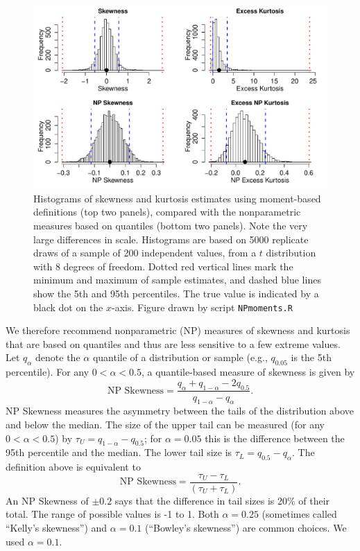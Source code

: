 \documentclass[12pt]{article}
\newcommand{\be}{\begin{equation}}
\newcommand{\ee}{\end{equation}}
\begin{document}
\begin{spacing}{1.9}
\begin{figure}[tbp]
\includegraphics[width=\textwidth]{figures/NPmoments.pdf}
\caption{Histograms of skewness and kurtosis estimates using moment-based definitions (top two panels), compared with the nonparametric measures based on quantiles (bottom two panels). 
Note the very large differences in scale. Histograms are based on 5000 replicate draws 
of a sample of 200 independent values, from a $t$ distribution with 8 degrees of freedom. 
Dotted red vertical lines mark the minimum and maximum of sample estimates, and dashed blue lines show the 5th and 95th percentiles. 
The true value is indicated by a black dot on the $x$-axis.
Figure drawn by script \texttt{NPmoments.R}}
\label{fig:NPmoments}
\end{figure} 

We therefore recommend nonparametric (NP) measures of skewness and kurtosis that are based on quantiles and thus are less sensitive to a few extreme values. 
Let $q_\alpha$ denote the $\alpha$ quantile of a distribution or sample (e.g., $q_{0.05}$ is the 5th percentile). 
For any $0 < \alpha < 0.5$, a quantile-based measure of skewness is given by \citep{mcgillivray-1986}
\be
\mbox{NP Skewness} = \frac{q_\alpha + q_{1-\alpha} - 2 q_{0.5}}{q_{1-\alpha} - q_\alpha}.
\ee
NP Skewness measures the asymmetry between the tails of the distribution above and below the median. 
The size of the upper tail can be measured (for any $0 < \alpha < 0.5$) by $\tau_U = q_{1-\alpha} - q_{0.5}$; for $\alpha=0.05$ this is the difference
between the 95th percentile and the median. 
The lower tail size is $\tau_L = q_{0.5} - q_\alpha$. The definition above is equivalent to  
\be
\mbox{NP Skewness} = \frac{\tau_U - \tau_L}{(\tau_U + \tau_L)}.
\label{eqn:NPskew}
\ee
An NP Skewness of $\pm 0.2$ says that the difference in tail sizes is 20\% of their total. 
The range of possible values is -1 to 1. 
Both $\alpha=0.25$ (sometimes called ``Kelly's skewness'') and $\alpha=0.1$ (``Bowley's skewness'') are common choices. 
We used $\alpha=0.1$.  
 

\end{spacing}
\end{document}
